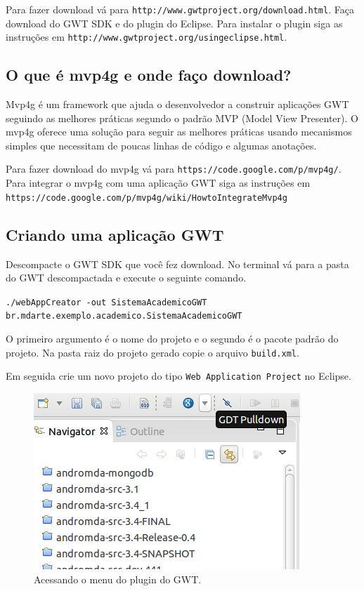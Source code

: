 Para fazer download vá para \texttt{http://www.gwtproject.org/download.html}.
Faça download do GWT SDK e do plugin do Eclipse. Para instalar o plugin siga as
instruções em \texttt{http://www.gwtproject.org/usingeclipse.html}.

\subsection{O que é mvp4g e onde faço download?}

Mvp4g é um framework que ajuda o desenvolvedor a construir aplicações GWT seguindo as melhores práticas segundo o padrão MVP
(Model View Presenter). O mvp4g oferece uma solução para seguir as melhores práticas usando mecanismos simples que necessitam de
poucas linhas de código e algumas anotações.

Para fazer download do mvp4g vá para \texttt{https://code.google.com/p/mvp4g/}.
Para integrar o mvp4g com uma aplicação GWT siga as instruções em
\texttt{https://code.google.com/p/mvp4g/wiki/HowtoIntegrateMvp4g}

\subsection{Criando uma aplicação GWT}

Descompacte o GWT SDK que você fez download. No terminal vá para a pasta do GWT descompactada e execute o seguinte comando.

\texttt{./webAppCreator -out SistemaAcademicoGWT br.mdarte.exemplo.academico.SistemaAcademicoGWT}

O primeiro argumento é o nome do projeto e o segundo é o pacote padrão do projeto. Na pasta raiz do projeto gerado copie o arquivo
\texttt{build.xml}.

Em seguida crie um novo projeto do tipo \texttt{Web Application Project} no Eclipse.

\begin{figure}[H]
	\centering
	\includegraphics[scale=0.8]{files/imgs/gwt-00.png}
	\caption{Acessando o menu do plugin do GWT.}
	\label{gwt00}
\end{figure}

